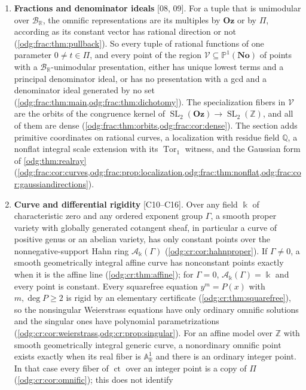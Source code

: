 \documentclass[11pt,oneside]{article}
\numberwithin{equation}{section}
\theoremstyle{definition}
\theoremstyle{remark}
\newcommand{\No}{\mathbf{No}}
\newcommand{\Oz}{\mathbf{Oz}}
\newcommand{\Z}{\mathbb Z}
\newcommand{\Q}{\mathbb Q}
\newcommand{\R}{\mathbb R}
\newcommand{\BR}{\mathcal B_{\R}}
\newcommand{\ct}{\operatorname{ct}}
\newcommand{\SL}{\operatorname{SL}}
\newcommand{\src}[1]{\textup{\textsf{\small[#1]}}}
\newcommand{\Og}{\Oz[i]}
\newcommand{\Tor}{\operatorname{Tor}}
\newcommand{\Vreg}{\mathcal V}
\newcommand{\crA}{\mathcal A_\Bbbk(\Gamma)}
\newcommand{\Aff}{\mathbb A}
\begin{document}
\begin{enumerate}[label=\textup{(\arabic*)},leftmargin=*,itemsep=3pt]
(\cref{odg:def:thm:autreal}); only $\Z$ lies in $\Oz\cap\R$. A phase twist
preserving $\Og$ shows that neither $\No$ nor conjugation is definable from
$\Og$ (\cref{odg:def:thm:norealaxis}).
\item \textbf{Fractions and denominator ideals} \src{08, 09}. For a tuple
that is unimodular over $\BR$, the omnific representations are its multiples
by $\Oz$ or by $\Pi$, according as its constant vector has rational direction
or not (\cref{odg:frac:thm:pullback}). So every tuple of rational functions of
one parameter $0\ne t\in\Pi$, and every point of the region
$\Vreg\subseteq\mathbb P^1(\No)$ of points with a $\BR$-unimodular
presentation, either has unique lowest terms and a principal denominator
ideal, or has no presentation with a gcd and a denominator ideal generated by
no set (\cref{odg:frac:thm:main,odg:frac:thm:dichotomy}). The specialization
fibers in $\Vreg$ are the orbits of the congruence kernel of
$\SL_2(\Oz)\to\SL_2(\Z)$, and all of them are dense
(\cref{odg:frac:thm:orbits,odg:frac:cor:dense}). The section adds primitive
coordinates on rational curves, a localization with residue field $\Q$, a
nonflat integral scale extension with its $\Tor_1$ witness, and the Gaussian
form of \cref{odg:thm:realray}
(\cref{odg:frac:cor:curves,odg:frac:prop:localization,odg:frac:thm:nonflat,odg:frac:cor:gaussiandirections}).
\item \textbf{Curve and differential rigidity} \src{C10--C16}. Over any field
$\Bbbk$ of characteristic zero and any ordered exponent group $\Gamma$, a smooth
proper variety with globally generated cotangent sheaf, in particular a curve of
positive genus or an abelian variety, has only constant points over the
nonnegative-support Hahn ring $\crA$ (\cref{odg:cr:cor:hahnproper}). If
$\Gamma\ne0$, a smooth geometrically integral affine curve has nonconstant
points exactly when it is the affine line (\cref{odg:cr:thm:affine}); for
$\Gamma=0$, $\crA=\Bbbk$ and every point is constant. Every squarefree equation $y^m=P(x)$ with
$m,\deg P\ge2$ is rigid by an elementary certificate (\cref{odg:cr:thm:squarefree}),
so the nonsingular Weierstrass equations have only ordinary omnific solutions and the
singular ones have polynomial parametrizations
(\cref{odg:cr:cor:weierstrass,odg:cr:prop:singular}). For an affine model over
$\Z$ with smooth geometrically integral generic curve, a nonordinary omnific
point exists exactly when its real fiber is $\Aff^1_\R$ and there is an
ordinary integer point. In that case every fiber of $\ct$ over an integer
point is a copy of $\Pi$ (\cref{odg:cr:cor:omnific}); this does not identify

\end{enumerate}
\end{document}
